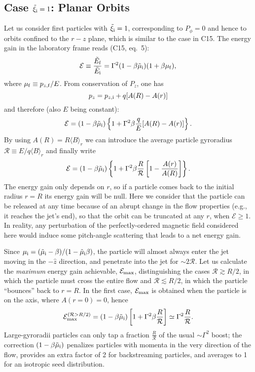 \documentclass[3p,times,twocolumn]{elsarticle}
\newcommand{\mui}{\mu_{\rm i}}
\newcommand{\muf}{\mu_{\rm f}}
\newcommand{\xii}{\xi_{\rm i}}
\begin{document}
\subsection{Case $\tilde\xii=1$: Planar Orbits}
Let us consider first particles with $\tilde\xii=1$, corresponding to $P_{\phi}=0$ and hence to orbits confined to the $r-z$ plane, which is similar to the case in C15.
The energy gain in the laboratory frame reads (C15, eq.\ 5):
\begin{equation}\label{eq:e}
\mathcal{E}\equiv \frac{\tilde E_{\rm f}}{\tilde E_{\rm i}}= \Gamma^2(1-\beta \tilde\mui)(1+\beta \muf),
\end{equation}
where $\muf\equiv p_{z,{\rm f}}/E$.
From conservation of $P_z$, one has
\begin{equation}
p_z= p_{z,{\rm i}}+q [A(R)-A(r)]
\end{equation}
and therefore (also $E$ being constant):
\begin{equation}
\mathcal{E}= (1-\beta \tilde\mui)
\left\{1+ \Gamma^2 \beta \frac{q}{E}[A(R)-A(r)]\right\}.
\end{equation}
By using $A(R)=R\langle B\rangle_r$ we can introduce the average particle  gyroradius $\mathcal R\equiv E/q\langle B\rangle_r$ and finally write
\begin{equation}
\mathcal{E}= (1-\beta \tilde\mui)
\left\{1+ \Gamma^2 \beta \frac{R}{\mathcal R}\left[1-\frac{A(r)}{A(R)}\right]\right\}.
\end{equation}
The energy gain only depends on $r$, so if a particle comes back to the initial radius $r=R$ its energy gain will be null. 
Here we consider that the particle can be released at any time because of an abrupt change in the flow properties (e.g., it reaches the jet's end), so that the orbit can be truncated at any $r$, when $\mathcal E\geq 1$.
In reality, any perturbation of the perfectly-ordered magnetic field considered here would induce some pitch-angle scattering that leads to a net energy gain.

Since $\mui=(\tilde\mui-\beta)/(1-\tilde\mui\beta)$, the particle will almost always enter the jet moving in the $-\hat z$ direction, and penetrate into the jet for $\sim 2\mathcal R$.
Let us calculate the \emph{maximum} energy gain achievable, $\mathcal E_{\rm max}$, distinguishing the cases $\mathcal R\gtrsim R/2$, in which the particle must cross the entire flow and $\mathcal R\lesssim R/2$, in which the particle ``bounces'' back  to $r=R$. 
In the first case, $\mathcal E_{\rm max}$ is obtained when the particle is on the axis, where $A(r=0)=0$, hence
\begin{equation}\label{eq:elarge}
\mathcal{E}_{\rm max}^{(\mathcal R>R/2)}= (1-\beta \tilde\mui)
\left[1+ \Gamma^2 \beta \frac{R}{\mathcal R}\right]
\simeq
\Gamma^2\frac{R}{\mathcal R}.
\end{equation}
Large-gyroradii particles can only tap a fraction $\frac{R}{\mathcal R}$ of the usual $\sim\Gamma^2$ boost;
the correction $(1-\beta \tilde\mui)$ penalizes particles with momenta in the very direction of the flow, provides an extra factor of 2 for backstreaming particles, and averages to 1 for an isotropic seed distribution.
\end{document}
